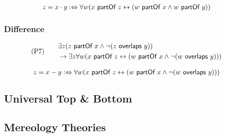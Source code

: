 \begin{align}
z = x \cdot y
:\Leftrightarrow
\forall w (x ~\textsf{partOf}~ z \leftrightarrow (w ~\textsf{partOf}~ x \wedge w ~\textsf{partOf}~ y))
\end{align}

\subsubsection{Difference}
\begin{align}
&\text{(P7)}
\quad
&\begin{split}
&\exists z (z ~\textsf{partOf}~ x \wedge \neg(z ~\textsf{overlaps}~ y))
\\&\rightarrow
\exists z \forall w (x ~\textsf{partOf}~ z \leftrightarrow (w ~\textsf{partOf}~ x \wedge \neg(w ~\textsf{overlaps}~ y)))
\end{split}
\end{align}

\begin{align}
z = x - y
:\Leftrightarrow
\forall w (x ~\textsf{partOf}~ z \leftrightarrow (w ~\textsf{partOf}~ x \wedge \neg(w ~\textsf{overlaps}~ y)))
\end{align}

\subsection{Universal Top \& Bottom}
\label{subsection:UniversalTopAndBottom}

\subsection{Mereology Theories}
\label{subsection:MereologyTheories}